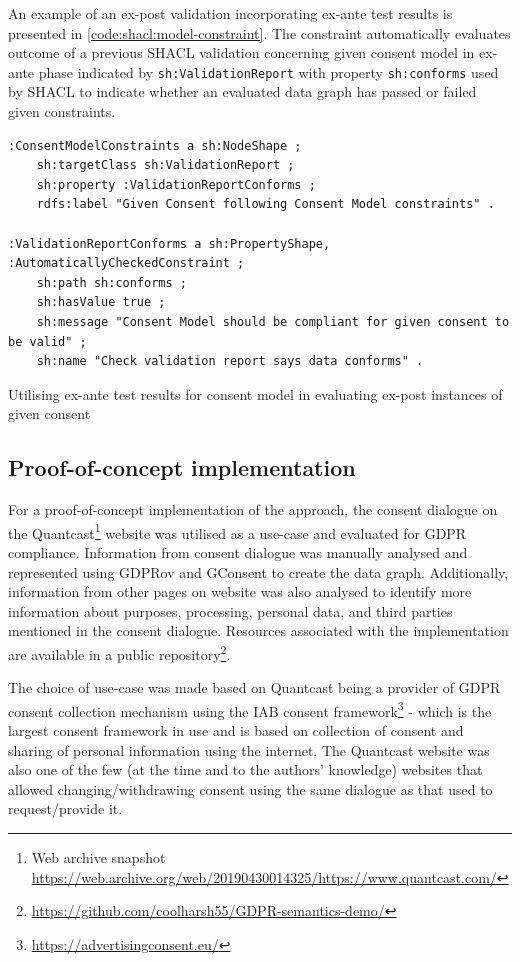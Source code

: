 An example of an ex-post validation incorporating ex-ante test results is presented in \autoref{code:shacl:model-constraint}.
The constraint automatically evaluates outcome of a previous SHACL validation concerning given consent model in ex-ante phase indicated by \texttt{sh:ValidationReport} with property \texttt{sh:conforms} used by SHACL to indicate whether an evaluated data graph has passed or failed given constraints.
\begin{listing}[htbp]
\begin{verbatim}
:ConsentModelConstraints a sh:NodeShape ;
    sh:targetClass sh:ValidationReport ; 
    sh:property :ValidationReportConforms ;
    rdfs:label "Given Consent following Consent Model constraints" .

:ValidationReportConforms a sh:PropertyShape, :AutomaticallyCheckedConstraint ;
    sh:path sh:conforms ;
    sh:hasValue true ; 
    sh:message "Consent Model should be compliant for given consent to be valid" ; 
    sh:name "Check validation report says data conforms" .
\end{verbatim}
\caption{Utilising ex-ante test results for consent model in evaluating ex-post instances of given consent}
\label{code:shacl:model-constraint}
\end{listing}

\subsection{Proof-of-concept implementation}\label{sec:testing:shacl:demo}
For a proof-of-concept implementation of the approach, the consent dialogue on the Quantcast\footnote{Web archive snapshot \url{https://web.archive.org/web/20190430014325/https://www.quantcast.com/}} website was utilised as a use-case and evaluated for GDPR compliance.
Information from consent dialogue was manually analysed and represented using GDPRov and GConsent to create the data graph. Additionally, information from other pages on website was also analysed to identify more information about  purposes, processing, personal data, and third parties mentioned in the consent dialogue.
Resources associated with the implementation are available in a public repository\footnote{\url{https://github.com/coolharsh55/GDPR-semantics-demo/}}.

The choice of use-case was made based on Quantcast being a provider of GDPR consent collection mechanism using the IAB consent framework\footnote{\url{https://advertisingconsent.eu/}} - which is the largest consent framework in use and is based on collection of consent and sharing of personal information using the internet. The Quantcast website was also one of the few (at the time and to the authors’ knowledge) websites that allowed changing/withdrawing consent using the same dialogue as that used to request/provide it.

